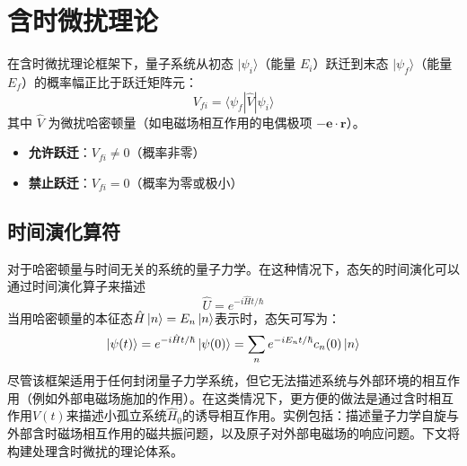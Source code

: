 \section{含时微扰理论}
在含时微扰理论框架下，量子系统从初态 $|\psi_i\rangle$（能量 $E_i$）跃迁到末态 $|\psi_f\rangle$（能量 $E_f$）的概率幅正比于跃迁矩阵元：
\begin{equation}
	V_{fi} = \langle \psi_f | \hat{V} | \psi_i \rangle
\end{equation}
其中 $\hat{V}$ 为微扰哈密顿量（如电磁场相互作用的电偶极项 $-\mathbf{e} \cdot \mathbf{r}$）。%
\begin{itemize}
	\item \textbf{允许跃迁}：$V_{fi} \neq 0$（概率非零）
	\item \textbf{禁止跃迁}：$V_{fi} = 0$（概率为零或极小）
\end{itemize}
\subsection{时间演化算符}
对于哈密顿量与时间无关的系统的量子力学。在这种情况下，态矢的时间演化可以通过时间演化算子来描述
\begin{equation*}
	\hat{U}=e^{-i\hat{H}t/\hbar}
\end{equation*}
当用哈密顿量的本征态$\hat{H}\ket{n}=E_n\ket{n}$表示时，态矢可写为：
\begin{equation}\label{12.1}
	\ket{\psi(t)}=e^{-i\hat{H}t/\hbar}\ket{\psi(0)}=\sum_n e^{-iE_n t/\hbar}c_n(0)\ket{n}
\end{equation}
尽管该框架适用于任何封闭量子力学系统，但它无法描述系统与外部环境的相互作用（例如外部电磁场施加的作用）。在这类情况下，更方便的做法是通过含时相互作用$V(t)$来描述小孤立系统$\hat{H}_0$的诱导相互作用。实例包括：描述量子力学自旋与外部含时磁场相互作用的磁共振问题，以及原子对外部电磁场的响应问题。下文将构建处理含时微扰的理论体系。

